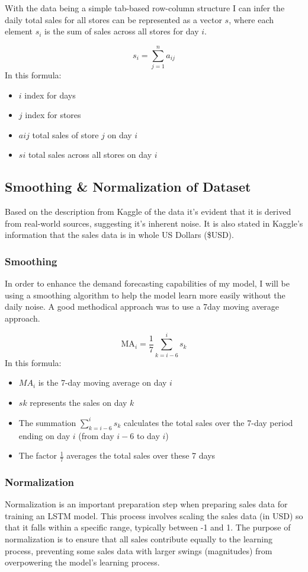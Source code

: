 \documentclass[10pt, journal, letterpaper, compsoc]{IEEEtran}
\begin{document}
With the data being a simple tab-based row-column structure I can infer the daily total sales for all stores can be represented as a vector $s$, where each element $s_i$ is the sum of sales across all stores for day $i$.

$$
s_i = \sum_{j=1}^{n} a_{ij}
$$
In this formula:
\begin{itemize}
    \item $i$ index for days
    \item $j$ index for stores
    \item $aij$ total sales of store $j$ on day $i$
    \item $si$ total sales across all stores on day $i$
\end{itemize}


\subsection{Smoothing \& Normalization of Dataset}
Based on the description from Kaggle\cite{demand-forecasting-kernels-only} of the data it's evident that it is derived from real-world sources, suggesting it's inherent noise. It is also stated in Kaggle's information that the sales data is in whole US Dollars (\$USD).
\subsubsection{Smoothing}
In order to enhance the demand forecasting capabilities of my model, I will be using a smoothing algorithm to help the model learn more easily without the daily noise. A good methodical approach was to use a 7day moving average approach.

$$
\text{MA}_i = \frac{1}{7} \sum_{k=i-6}^{i} s_k
$$
In this formula:
\begin{itemize}
    \item $MA_i$ is the 7-day moving average on day $i$
    \item $sk$ represents the sales on day $k$
    \item The summation $\sum_{k=i-6}^{i} s_k$ calculates the total sales over the 7-day period ending on day $i$ (from day $i-6$ to day $i$)
    \item The factor $\frac{1}{7}$ averages the total sales over these 7 days
\end{itemize}

\subsubsection{Normalization}
Normalization is an important preparation step when preparing sales data for training an LSTM model\cite{improved-sales-forecasting}. This process involves scaling the sales data (in USD) so that it falls within a specific range, typically between -1 and 1. The purpose of normalization is to ensure that all sales contribute equally to the learning process, preventing some sales data with larger swings (magnitudes) from overpowering the model's learning process.
\end{document}
